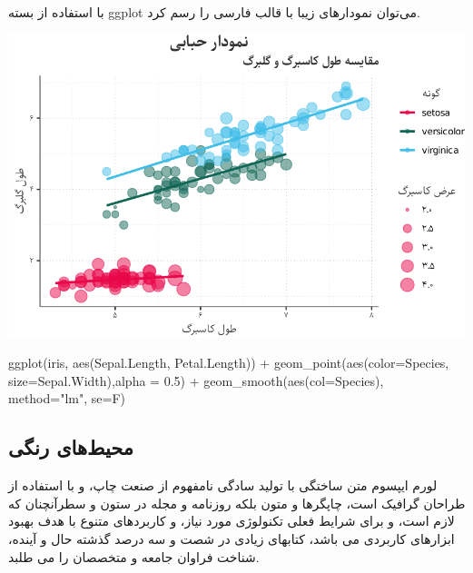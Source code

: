 \documentclass[
]{article}
\newenvironment{Shaded}{\begin{snugshade}}{\end{snugshade}}
\newcommand{\AttributeTok}[1]{\textcolor[rgb]{0.77,0.63,0.00}{#1}}
\newcommand{\FloatTok}[1]{\textcolor[rgb]{0.00,0.00,0.81}{#1}}
\newcommand{\FunctionTok}[1]{\textcolor[rgb]{0.00,0.00,0.00}{#1}}
\newcommand{\NormalTok}[1]{#1}
\newcommand{\SpecialCharTok}[1]{\textcolor[rgb]{0.00,0.00,0.00}{#1}}
\newcommand{\StringTok}[1]{\textcolor[rgb]{0.31,0.60,0.02}{#1}}
\newenvironment{rmdThink}{
	\vspace*{0.5\baselineskip}
    \par\noindent
    \begin{tcolorbox}[enhanced, title={\large{\color{white}بیشتر بدانیم }},colback=MPIGreen!10!white, colframe=MPIGreen]
    \itshape
}{
    \end{tcolorbox}
    \par\ignorespacesafterend
}
\begin{document}
با استفاده از بسته ggplot می‌توان نمودارهای زیبا با قالب فارسی را رسم
کرد.

\begin{center}\includegraphics{figure/scatterPlot-1} \end{center}

\begin{Shaded}
\begin{Highlighting}[]
\FunctionTok{ggplot}\NormalTok{(iris, }\FunctionTok{aes}\NormalTok{(Sepal.Length, Petal.Length)) }\SpecialCharTok{+} 
  \FunctionTok{geom\_point}\NormalTok{(}\FunctionTok{aes}\NormalTok{(}\AttributeTok{color=}\NormalTok{Species, }\AttributeTok{size=}\NormalTok{Sepal.Width),}\AttributeTok{alpha =} \FloatTok{0.5}\NormalTok{) }\SpecialCharTok{+}
  \FunctionTok{geom\_smooth}\NormalTok{(}\FunctionTok{aes}\NormalTok{(}\AttributeTok{col=}\NormalTok{Species), }\AttributeTok{method=}\StringTok{"lm"}\NormalTok{, }\AttributeTok{se=}\NormalTok{F)}
\end{Highlighting}
\end{Shaded}

\hypertarget{ux645ux62dux6ccux637ux647ux627ux6cc-ux631ux646ux6afux6cc}{%
\subsection{محیط‌های
رنگی}\label{ux645ux62dux6ccux637ux647ux627ux6cc-ux631ux646ux6afux6cc}}

\begin{rmdThink}
لورم ایپسوم متن ساختگی با تولید سادگی نامفهوم از صنعت چاپ، و با استفاده
از طراحان گرافیک است، چاپگرها و متون بلکه روزنامه و مجله در ستون و
سطرآنچنان که لازم است، و برای شرایط فعلی تکنولوژی مورد نیاز، و کاربردهای
متنوع با هدف بهبود ابزارهای کاربردی می باشد، کتابهای زیادی در شصت و سه
درصد گذشته حال و آینده، شناخت فراوان جامعه و متخصصان را می طلبد.

\end{rmdThink}
\end{document}

